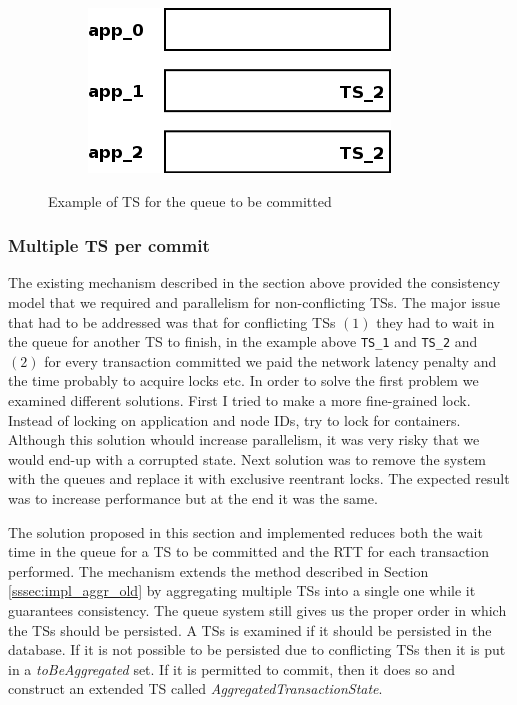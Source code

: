 \begin{figure}
\begin{subfigure}[t]{0.3\textwidth}
    \caption{}
    \label{fig:impl_tx_aggr_sub3}
  \end{subfigure}
  \qquad
  \begin{subfigure}[t]{0.3\textwidth}
    \includegraphics[scale=0.4]{resources/images/Implementation/commit_system_4.png}
    \caption{}
    \label{fig:impl_tx_aggr_sub4}
  \end{subfigure}

  \caption{Example of TS for the queue to be committed}
  \label{fig:impl_tx_aggr_queue}
\end{figure}

\subsubsection{Multiple TS per commit}
\label{sssec:impl_aggr_new}
The existing mechanism described in the section above provided the
consistency model that we required and parallelism for
non-conflicting TSs. The major issue that had to be addressed was that
for conflicting TSs $(1)$ they had to wait in the queue for another TS
to finish, in the example above \texttt{TS\_1} and \texttt{TS\_2} and
$(2)$ for every transaction committed we paid the network latency
penalty and the time probably to acquire locks etc. In order to solve
the first problem we examined different solutions. First I tried to
make a more fine-grained lock. Instead of locking on application and
node IDs, try to lock for containers. Although this solution whould
increase parallelism, it was very risky that we would end-up with a
corrupted state. Next solution was to remove the system with the
queues and replace it with exclusive reentrant locks. The expected
result was to increase performance but at the end it was the same.

The solution proposed in this section and implemented reduces both the
wait time in the queue for a TS to be committed and the RTT for each
transaction performed. The mechanism extends the method described in
Section \ref{sssec:impl_aggr_old} by aggregating multiple TSs into a
single one while it guarantees consistency. The queue system still
gives us the proper order in which the TSs should be persisted. A TSs
is examined if it should be persisted in the database. If it is not
possible to be persisted due to conflicting TSs then it is put in a
\emph{toBeAggregated} set. If it is permitted to commit, then it does so
and construct an extended TS called
\emph{AggregatedTransactionState}.

